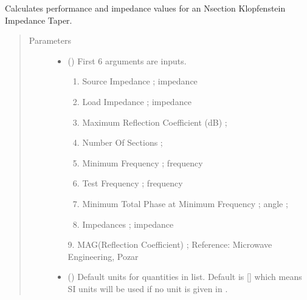 \documentclass[letterpaper,10pt,english]{sphinxmanual}
\begin{document}

\begin{fulllineitems}
\label{\detokenize{components:components.Klopfenstein_Taper_Impedance_Transformer}}
Calculates performance and impedance values for an N\sphinxhyphen{}section Klopfenstein Impedance Taper.
\begin{quote}\begin{description}
\item[{Parameters}] \leavevmode\begin{itemize}
\item {} 
 () \textendash{} 
First 6 arguments are inputs.
\begin{enumerate}
%
\item {} 
Source Impedance ; impedance

\item {} 
Load Impedance ; impedance

\item {} 
Maximum Reflection Coefficient (dB) ;

\item {} 
Number Of Sections ;

\item {} 
Minimum Frequency ; frequency

\item {} 
Test Frequency ; frequency

\item {} 
Minimum Total Phase at Minimum Frequency ; angle ;

\item {} 
Impedances ; impedance

\end{enumerate}

9.  MAG(Reflection Coefficient) ;
Reference:  Microwave Engineering, Pozar


\item {} 
 (\sphinxstyleliteralemphasis{\sphinxupquote{, }}) \textendash{} Default units for quantities in  list. Default is {[}{]} which means SI units will be used if no unit is given in .


\end{itemize}
\end{description}
\end{quote}
\end{fulllineitems}
\end{document}
